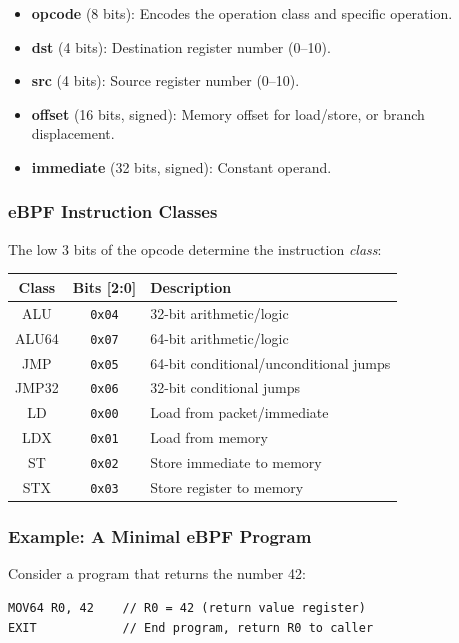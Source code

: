 \documentclass[11pt,letterpaper]{article}
\begin{document}
\begin{itemize}
    \item \textbf{opcode} (8 bits): Encodes the operation class and specific operation.
    \item \textbf{dst} (4 bits): Destination register number (0--10).
    \item \textbf{src} (4 bits): Source register number (0--10).
    \item \textbf{offset} (16 bits, signed): Memory offset for load/store, or branch displacement.
    \item \textbf{immediate} (32 bits, signed): Constant operand.
\end{itemize}

\subsubsection{eBPF Instruction Classes}

The low 3 bits of the opcode determine the instruction \emph{class}:

\begin{center}
\begin{tabular}{ccl}
\toprule
\textbf{Class} & \textbf{Bits [2:0]} & \textbf{Description} \\
\midrule
ALU & \texttt{0x04} & 32-bit arithmetic/logic \\
ALU64 & \texttt{0x07} & 64-bit arithmetic/logic \\
JMP & \texttt{0x05} & 64-bit conditional/unconditional jumps \\
JMP32 & \texttt{0x06} & 32-bit conditional jumps \\
LD & \texttt{0x00} & Load from packet/immediate \\
LDX & \texttt{0x01} & Load from memory \\
ST & \texttt{0x02} & Store immediate to memory \\
STX & \texttt{0x03} & Store register to memory \\
\bottomrule
\end{tabular}
\end{center}

\subsubsection{Example: A Minimal eBPF Program}

Consider a program that returns the number 42:

\begin{lstlisting}[style=asm]
MOV64 R0, 42    // R0 = 42 (return value register)
EXIT            // End program, return R0 to caller
\end{lstlisting}
\end{document}
